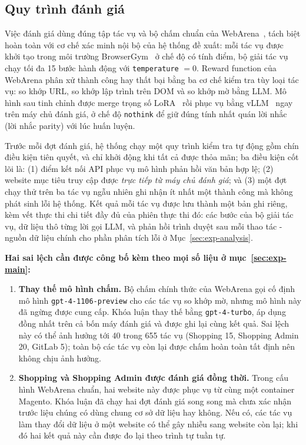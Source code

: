 \subsection{Quy trình đánh giá}
\label{sec:exp-protocol}

Việc đánh giá dùng đúng tập tác vụ và bộ chấm chuẩn của WebArena~\cite{zhou2024webarena}, tách biệt hoàn toàn với cơ chế xác minh nội bộ của hệ thống đề xuất: mỗi tác vụ được khởi tạo trong môi trường BrowserGym~\cite{dechezelles2025browsergym} ở chế độ có tính điểm, bộ giải tác vụ chạy tối đa 15 bước hành động với \texttt{temperature} $= 0$. Reward function của WebArena phân xử thành công hay thất bại bằng ba cơ chế kiểm tra tùy loại tác vụ: so khớp URL, so khớp lập trình trên DOM và so khớp mờ bằng LLM. Mô hình sau tinh chỉnh được merge trọng số LoRA~\cite{hu2022lora} rồi phục vụ bằng vLLM~\cite{kwon2023vllm} ngay trên máy chủ đánh giá, ở chế độ \texttt{nothink} để giữ đúng tính nhất quán lời nhắc (lời nhắc parity) với lúc huấn luyện.

Trước mỗi đợt đánh giá, hệ thống chạy một quy trình kiểm tra tự động gồm chín điều kiện tiên quyết, và chỉ khởi động khi tất cả được thỏa mãn; ba điều kiện cốt lõi là: (1) điểm kết nối API phục vụ mô hình phản hồi văn bản hợp lệ; (2) website mục tiêu truy cập được \emph{trực tiếp từ máy chủ đánh giá}; và (3) một đợt chạy thử trên ba tác vụ ngẫu nhiên ghi nhận ít nhất một thành công mà không phát sinh lỗi hệ thống. Kết quả mỗi tác vụ được lưu thành một bản ghi riêng, kèm vết thực thi chi tiết đầy đủ của phiên thực thi đó: các bước của bộ giải tác vụ, dữ liệu thô từng lời gọi LLM, và phản hồi trình duyệt sau mỗi thao tác - nguồn dữ liệu chính cho phần phân tích lỗi ở Mục~\ref{sec:exp-analysis}.

\textbf{Hai sai lệch cần được công bố kèm theo mọi số liệu ở mục~\ref{sec:exp-main}:}

\begin{enumerate}
  \item \textbf{Thay thế mô hình chấm.} Bộ chấm chính thức của WebArena gọi cố định mô hình \texttt{gpt-4-1106-preview} cho các tác vụ so khớp mờ, nhưng mô hình này đã ngừng được cung cấp. Khóa luận thay thế bằng \texttt{gpt-4-turbo}, áp dụng đồng nhất trên cả bốn máy đánh giá và được ghi lại cùng kết quả. Sai lệch này có thể ảnh hưởng tới 40 trong 655 tác vụ (Shopping 15, Shopping Admin 20, GitLab 5); toàn bộ các tác vụ còn lại được chấm hoàn toàn tất định nên không chịu ảnh hưởng.
  \item \textbf{Shopping và Shopping Admin được đánh giá đồng thời.} Trong cấu hình WebArena chuẩn, hai website này được phục vụ từ cùng một container Magento. Khóa luận đã chạy hai đợt đánh giá song song mà chưa xác nhận trước liệu chúng có dùng chung cơ sở dữ liệu hay không. Nếu có, các tác vụ làm thay đổi dữ liệu ở một website có thể gây nhiễu sang website còn lại; khi đó hai kết quả này cần được đo lại theo trình tự tuần tự.
\end{enumerate}

